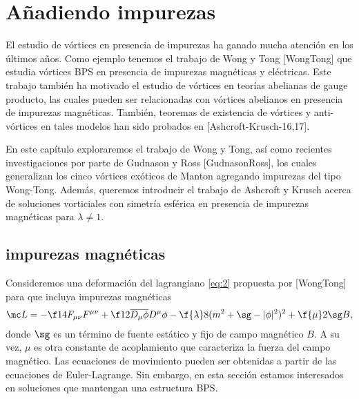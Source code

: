 
\chapter{Añadiendo impurezas} %

\label{ch:impurities} %


El estudio de vórtices en presencia de impurezas ha ganado mucha atención en los últimos años. Como ejemplo tenemos el trabajo de Wong y Tong [WongTong] que estudia vórtices BPS en presencia de impurezas magnéticas y eléctricas. Este trabajo también ha motivado el estudio de vórtices en teorías abelianas de gauge producto, las cuales pueden ser relacionadas con vórtices abelianos en presencia de impurezas magnéticas. También, teoremas de existencia de vórtices y anti-vórtices en tales modelos han sido probados en [Ashcroft-Krusch-16,17].

En este capítulo exploraremos el trabajo de Wong y Tong, así como recientes investigaciones por parte de Gudnason y Ross [GudnasonRoss], los cuales generalizan los cinco vórtices exóticos de Manton agregando impurezas del tipo Wong-Tong. Además, queremos introducir el trabajo de Ashcroft y Krusch acerca de soluciones vorticiales con simetría esférica en presencia de impurezas magnéticas para $\lambda\neq 1$.

\section{impurezas magnéticas}

Consideremos una deformación del lagrangiano \eqref{eq:2} propuesta por [WongTong] para que incluya impurezas magnéticas
\begin{align}
	\mc L = -\f 14 F_{\mu\nu}F^{\mu\nu}+\f 12\overline{D_\mu\phi}D^\mu\phi-\f{\lambda}8(m^2+\sg-|\phi|^2)^2+\f{\mu}2\sg B, \label{eq:7.1.0.1}
\end{align}
donde $\sg$ es un término de fuente estático y fijo de campo magnético $B$. A su vez, $\mu$ es otra constante de acoplamiento que caracteriza la fuerza del campo magnético. Las ecuaciones de movimiento pueden ser obtenidas a partir de las ecuaciones de Euler-Lagrange. Sin embargo, en esta sección estamos interesados en soluciones que mantengan una estructura BPS.

